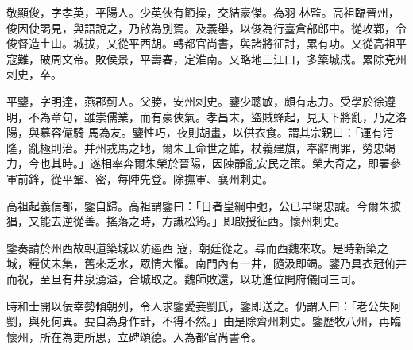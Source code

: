 \begin{pinyinscope}
 敬顯俊，字孝英，平陽人。少英俠有節操，交結豪傑。為羽
 林監。高祖臨晉州，俊因使謁見，與語說之，乃啟為別駕。及義舉，以俊為行臺倉部郎中。從攻鄴，令俊督造土山。城拔，又從平西胡。轉都官尚書，與諸將征討，累有功。又從高祖平寇難，破周文帝。敗侯景，平壽春，定淮南。又略地三江口，多築城戍。累除兗州刺史，卒。



 平鑒，字明達，燕郡薊人。父勝，安州刺史。鑒少聰敏，頗有志力。受學於徐遵明，不為章句，雖崇儒業，而有豪俠氣。孝昌末，盜賊蜂起，見天下將亂，乃之洛陽，與慕容儼騎
 馬為友。鑒性巧，夜則胡畫，以供衣食。謂其宗親曰：「運有污隆，亂極則治。并州戎馬之地，爾朱王命世之雄，杖義建旗，奉辭問罪，勞忠竭力，今也其時。」遂相率奔爾朱榮於晉陽，因陳靜亂安民之策。榮大奇之，即署參軍前鋒，從平鞏、密，每陣先登。除撫軍、襄州刺史。



 高祖起義信都，鑒自歸。高祖謂鑒曰：「日者皇綱中弛，公已早竭忠誠。今爾朱披猖，又能去逆從善。搖落之時，方識松筠。」即啟授征西。懷州刺史。



 鑒奏請於州西故軹道築城以防遏西
 寇，朝廷從之。尋而西魏來攻。是時新築之城，糧仗未集，舊來乏水，眾情大懼。南門內有一井，隨汲即竭。鑒乃具衣冠俯井而祝，至旦有井泉湧溢，合城取之。魏師敗還，以功進位開府儀同三司。



 時和士開以佞幸勢傾朝列，令人求鑒愛妾劉氏，鑒即送之。仍謂人曰：「老公失阿劉，與死何異。要自為身作計，不得不然。」由是除齊州刺史。鑒歷牧八州，再臨懷州，所在為吏所思，立碑頌德。入為都官尚書令。



\end{pinyinscope}